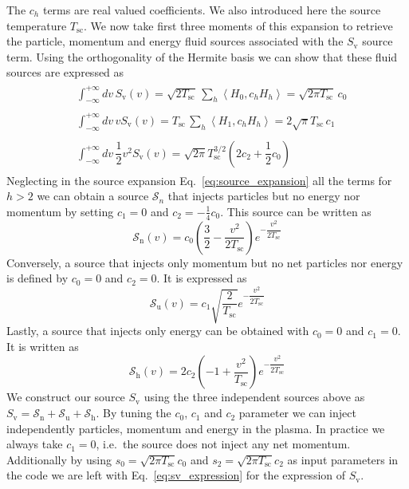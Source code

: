 \documentclass[11pt]{article}
\begin{document}
%
The $c_h$ terms are real valued coefficients. We also introduced here the source temperature $T_\mathrm{sc}$. We now take first three moments of this expansion to retrieve the particle, momentum and energy fluid sources associated with the $S_\mathrm{v}$ source term. Using the orthogonality of the Hermite basis we can show that these fluid sources are expressed as 
%
\begin{align*}
    &
    \begin{aligned}
        \int_{-\infty}^{+\infty} dv\, S_\mathrm{v}(v) = \sqrt{2 T_\mathrm{sc}} \, \sum\limits_{h}^{} \left<H_0, c_h H_h \right> = \sqrt{2 \pi  T_\mathrm{sc}} \, c_0
    \end{aligned} \\
    &
    \begin{aligned}
    \int_{-\infty}^{+\infty} dv\, v S_\mathrm{v}(v) = T_\mathrm{sc} \, \sum\limits_{h}^{} \left<H_1, c_h H_h \right> = 2\sqrt{\pi} T_\mathrm{sc} \, c_1
    \end{aligned} \\
    &
    \begin{aligned}
    \int_{-\infty}^{+\infty} dv\, \dfrac{1}{2} v^2 S_\mathrm{v}(v) =  \sqrt{2\pi } T_\mathrm{sc}^{3/2}  \left( 2c_2 + \dfrac{1}{2}c_0 \right)
    \end{aligned}
\end{align*}
%
Neglecting in the source expansion Eq.~\ref{eq:source_expansion} all the terms for $h>2$ we can obtain a source $\mathcal{S}_n$ that injects particles but no energy nor momentum by setting $c_1 = 0$ and $c_2 = -\tfrac{1}{4}c_0$. This source can be written as
%
\begin{equation}\label{eq:source_density_only}
\mathcal{S}_\mathrm{n}(v) = c_0 \left( \dfrac{3}{2} - \dfrac{v^2}{2 T_\mathrm{sc}} \right) e^{- \dfrac{v^2}{2 T_\mathrm{sc}}} 
\end{equation}
%
Conversely, a source that injects only momentum but no net particles nor energy is defined by $c_0 = 0$ and $c_2 = 0$. It is expressed as 
%
\begin{equation}\label{eq:source_momentum_only}
\mathcal{S}_\mathrm{u}(v) = c_1 \sqrt{ \dfrac{2}{T_\mathrm{sc}}}  e^{- \dfrac{v^2}{2 T_\mathrm{sc}}} 
\end{equation}
%
Lastly, a source that injects only energy can be obtained with $c_0 = 0$ and $c_1 = 0$. It is written as 
%
\begin{equation}\label{eq:source_energy_only}
\mathcal{S}_\mathrm{h}(v) = 2c_2 \left( -1 + \dfrac{v^2}{T_\mathrm{sc}} \right)   e^{- \dfrac{v^2}{2 T_\mathrm{sc}}} 
\end{equation}
%
We construct our source $S_\mathrm{v}$ using the three independent sources above as $S_\mathrm{v} = \mathcal{S}_\mathrm{n} + \mathcal{S}_\mathrm{u} + \mathcal{S}_\mathrm{h}$. By tuning the $c_0$, $c_1$ and $c_2$ parameter we can inject independently particles, momentum and energy in the plasma. In practice we always take $c_1=0$, i.e.\ the source does not inject any net momentum. Additionally by using $s_0 = \sqrt{2 \pi T_\mathrm{sc}}c_0 $ and $s_2 = \sqrt{2 \pi T_\mathrm{sc}}c_2 $ as input parameters in the code we are left with Eq.~\ref{eq:sv_expression} for the expression of $S_\mathrm{v}$.

\newpage
\printbibliography
\end{document}

